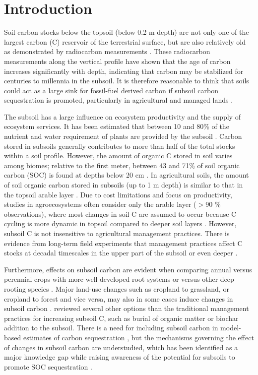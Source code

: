 \documentclass[11pt, oneside, a4paper]{article}   	%
\begin{document}
\section{Introduction}
Soil carbon stocks below the topsoil (below  0.2 m depth) are not only one of the largest carbon (C) reservoir of the terrestrial surface, but are also relatively old as demonstrated by radiocarbon measurements \citep{Mathieu2015, He2016, Shi2020, Heckman2022}. These radiocarbon measurements along the vertical profile have shown that the age of carbon increases significantly with depth, indicating that carbon may be stabilized for centuries to millennia in the subsoil. It is therefore reasonable to think that soils could act as a large sink for fossil-fuel derived carbon if subsoil carbon sequestration is promoted, particularly in agricultural and managed lands \citep{Rumpel2012, Button2022}. 

The subsoil has a large influence on ecosystem productivity and the supply of ecosystem services. It has been estimated that between 10 and 80\% of the nutrient and water requirement of plants are provided by the subsoil \citep{Hinzmann2021}. Carbon stored in subsoils generally contributes to more than half of the total stocks within a soil profile. However, the amount of organic C stored in soil varies among biomes; relative to the first meter, between 43 and 71\% of soil organic carbon (SOC) is found at depths below 20 cm \citep{Jobbagy2000}. In agricultural soils, the amount of soil organic carbon stored in subsoils (up to 1 m depth) is similar to that in the topsoil arable layer \citep{Morari2019}. Due to cost limitations and focus on productivity, studies in agroecosystems often consider only the arable layer ($>90$ \% observations), where most changes in soil C are assumed to occur because C cycling is more dynamic in topsoil compared to deeper soil layers \citep{Bolinder2020}. However, subsoil C is not insensitive to agricultural management practices. There is evidence from long-term field experiments that management practices affect C stocks at decadal timescales in the upper part of the subsoil or even deeper \citep[e.g.][]{Kirchmann2013, Kaetterer2014, Menichetti2015, Borjesson2018, DalFerro2020, Slessarev2020}.

Furthermore, effects on subsoil carbon are evident when comparing annual versus perennial crops with more well developed root systems or versus other deep rooting species \citep{Carter2010, Collins2010, VandenBygaart2011, Guan2016}. Major land-use changes such as cropland to grassland, or cropland to forest and vice versa, may also in some cases induce changes in subsoil carbon \citep{Guo2002, Poeplau2013}. \citet{Button2022} reviewed several other options than the traditional management practices for increasing subsoil C, such as burial of organic matter or biochar addition to the subsoil. There is a need for including subsoil carbon in model-based estimates of carbon sequestration \citep{Button2022, HicksPries2023}, but the mechanisms governing the effect of changes in subsoil carbon are understudied, which has been identified as a major knowledge gap \citep{Lorenz2005, Chenu2019} while raising awareness of the potential for subsoils to promote SOC sequestration \citep{Kautz2013, Chen2018}.
\end{document}
